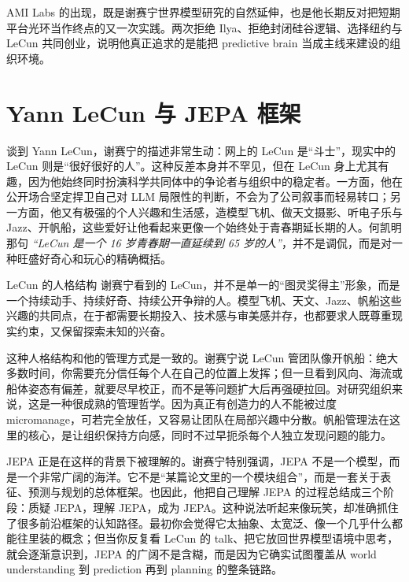 \documentclass[a4paper,12pt]{article}
\begin{document}
AMI Labs 的出现，既是谢赛宁世界模型研究的自然延伸，也是他长期反对把短期平台光环当作终点的又一次实践。两次拒绝 Ilya、拒绝封闭硅谷逻辑、选择纽约与 LeCun 共同创业，说明他真正追求的是能把 predictive brain 当成主线来建设的组织环境。

\section{Yann LeCun 与 JEPA 框架}

谈到 Yann LeCun，谢赛宁的描述非常生动：网上的 LeCun 是“斗士”，现实中的 LeCun 则是“很好很好的人”。这种反差本身并不罕见，但在 LeCun 身上尤其有趣，因为他始终同时扮演科学共同体中的争论者与组织中的稳定者。一方面，他在公开场合坚定捍卫自己对 LLM 局限性的判断，不会为了公司叙事而轻易转口；另一方面，他又有极强的个人兴趣和生活感，造模型飞机、做天文摄影、听电子乐与 Jazz、开帆船，这些爱好让他看起来更像一个始终处于青春期延长期的人。何凯明那句 \textit{``LeCun 是一个 16 岁青春期一直延续到 65 岁的人''}，并不是调侃，而是对一种旺盛好奇心和玩心的精确概括。

\begin{knowledgebox}{LeCun 的人格结构}
谢赛宁看到的 LeCun，并不是单一的“图灵奖得主”形象，而是一个持续动手、持续好奇、持续公开争辩的人。模型飞机、天文、Jazz、帆船这些兴趣的共同点，在于都需要长期投入、技术感与审美感并存，也都要求人既尊重现实约束，又保留探索未知的兴奋。
\end{knowledgebox}

这种人格结构和他的管理方式是一致的。谢赛宁说 LeCun 管团队像开帆船：绝大多数时间，你需要充分信任每个人在自己的位置上发挥；但一旦看到风向、海流或船体姿态有偏差，就要尽早校正，而不是等问题扩大后再强硬拉回。对研究组织来说，这是一种很成熟的管理哲学。因为真正有创造力的人不能被过度 micromanage，可若完全放任，又容易让团队在局部兴趣中分散。帆船管理法在这里的核心，是让组织保持方向感，同时不过早扼杀每个人独立发现问题的能力。

JEPA 正是在这样的背景下被理解的。谢赛宁特别强调，JEPA 不是一个模型，而是一个非常广阔的海洋。它不是“某篇论文里的一个模块组合”，而是一套关于表征、预测与规划的总体框架。也因此，他把自己理解 JEPA 的过程总结成三个阶段：质疑 JEPA，理解 JEPA，成为 JEPA。这种说法听起来像玩笑，却准确抓住了很多前沿框架的认知路径。最初你会觉得它太抽象、太宽泛、像一个几乎什么都能往里装的概念；但当你反复看 LeCun 的 talk、把它放回世界模型语境中思考，就会逐渐意识到，JEPA 的广阔不是含糊，而是因为它确实试图覆盖从 world understanding 到 prediction 再到 planning 的整条链路。
\end{document}
